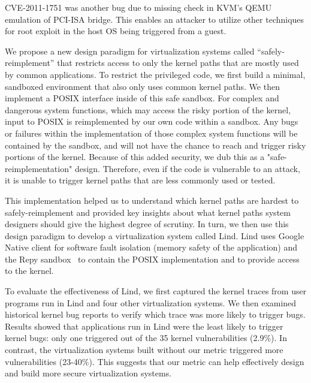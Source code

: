 CVE-2011-1751 was another bug due to missing check in KVM's QEMU emulation of PCI-ISA bridge. This enables an attacker to utilize other techniques \cite{Virtunoid} for root exploit in the host OS being triggered from a guest. 

We propose a new design paradigm for virtualization 
systems called ``safely-reimplement'' that restricts access to only the
kernel paths that are mostly used by common applications.  To restrict the privileged
code, we first build a minimal, sandboxed environment that also only uses 
common kernel paths.
We then implement a POSIX interface inside of this safe sandbox. For complex and dangerous system functions, which may access the risky portion of the kernel, 
input to POSIX is reimplemented by our own code within a sandbox. Any bugs or failures within the implementation of those complex system functions 
will be contained by the sandbox, and will not have the chance to reach 
and trigger risky portions of the kernel. Because of this added security, we dub this as a "safe-reimplementation" design.  Therefore, even if the code
is vulnerable to an attack, it is unable to trigger
kernel paths that are less commonly used or tested.

This implementation helped us to understand which kernel paths are hardest to
safely-reimplement and provided key insights about what kernel paths system
designers should give the highest degree of scrutiny. In turn, we then use this design paradigm to develop a virtualization system called
Lind.  Lind uses Google Native client for software fault isolation (memory
safety of the application) and the Repy sandbox~\cite{Repy-10} to contain the POSIX
implementation and to provide access to the kernel.   

To evaluate the effectiveness of Lind, we first captured the 
kernel traces from user programs run in Lind and four other virtualization
systems.
We then examined historical
kernel bug reports to verify which trace was more likely to trigger bugs.
Results showed that applications run in Lind were the least likely to
trigger kernel bugs: only one triggered out of the 35 kernel vulnerabilities 
(2.9\%). In contrast, the virtualization systems built
without our metric triggered more vulnerabilities (23-40\%). This
suggests that our metric can help effectively design and build more secure
virtualization systems.

